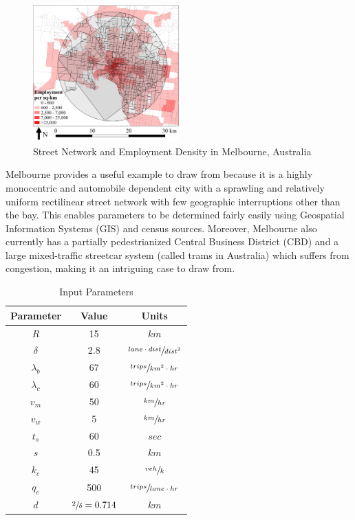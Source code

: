 \documentclass{elsarticle}\usepackage[]{graphicx}\usepackage[]{color}
\begin{document}
\begin{figure}[H]
    \centering
     \includegraphics[width=0.5\textwidth]{mel_vicmap}
    \caption{Street Network and Employment Density in Melbourne, Australia}
    \label{fig:mel_vicmap}
\end{figure}

Melbourne provides a useful example to draw from because it is a highly monocentric and automobile dependent city with a sprawling and relatively uniform rectilinear street network with few geographic interruptions other than the bay. This enables parameters to be determined fairly easily using Geospatial Information Systems (GIS) and census sources. Moreover, Melbourne also currently has a partially pedestrianized Central Business District (CBD) and a large mixed-traffic streetcar system (called trams in Australia) which suffers from congestion, making it an intriguing case to draw from.

\begin{table}[H]
\centering\small
\caption{Input Parameters}
\begin{tabular}{ccc}
\toprule
Parameter   & Value & Units \\ \hline
$R$         & 15			& $km$                              \\
$\delta$    & 2.8 		& $\sfrac{lane\cdot dist}{dist^2}$  \\
$\lambda_b$ & 67	& $\sfrac{trips}{km^2\cdot hr}$     \\
$\lambda_c$ & 60	& $\sfrac{trips}{km^2\cdot hr}$     \\
$v_m$       & 50		& $\sfrac{km}{hr}$                  \\
$v_w$       & 5		& $\sfrac{km}{hr}$                  \\
$t_s$       & 60	& $sec$                              \\
$s$         & 0.5			& $km$                              \\
$k_c$       & 45		& $\sfrac{veh}{k}$                  \\
$q_c$       & 500		& $\sfrac{trips}{lane \cdot hr}$    \\
$d$         & $\sfrac{2}{\delta}=0.714$ & $km$                          \\\bottomrule
\end{tabular}
\label{tab:inputpars}
\end{table}
\end{document}
